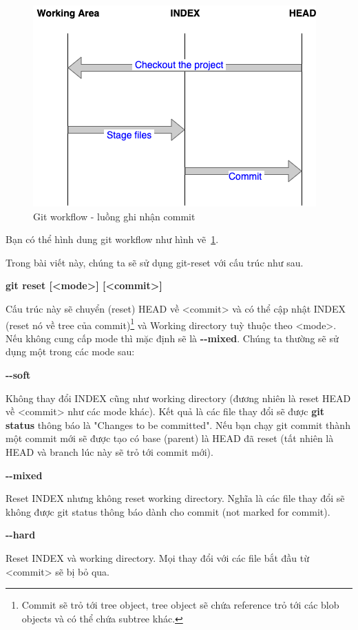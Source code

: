 \documentclass[a4paper, 11pt]{article}
\begin{document}
\begin{figure}
\centering
\includegraphics[scale=0.6]{git-workflow.png}
\caption{Git workflow - luồng ghi nhận commit}
\label{fig:git-workflow}
\end{figure}

Bạn có thể hình dung git workflow như hình vẽ~\ref{fig:git-workflow}.

Trong bài viết này, chúng ta sẽ sử dụng git-reset với cấu trúc như sau.

\textbf{git reset [<mode>] [<commit>]}

Cấu trúc này sẽ chuyển (reset) HEAD về <commit> và có thể cập nhật INDEX (reset nó về tree của commit)\footnote{Commit sẽ trỏ tới tree object, tree object sẽ chứa reference trỏ tới các blob objects và có thể chứa subtree khác.} và Working directory tuỳ thuộc theo <mode>. Nếu không cung cấp mode thì mặc định sẽ là \textbf{-{}-mixed}. Chúng ta thường sẽ sử dụng một trong các mode sau:

\textbf{-{}-soft}

Không thay đổi INDEX cũng như working directory (đương nhiên là reset HEAD về <commit> như các mode khác). Kết quả là các file thay đổi sẽ được \textbf{git status} thông báo là "Changes to be committed". Nếu bạn chạy git commit thành một commit mới sẽ được tạo có base (parent) là HEAD đã reset (tất nhiên là HEAD và branch lúc này sẽ trỏ tới commit mới).

\textbf{-{}-mixed}

Reset INDEX nhưng không reset working directory. Nghĩa là các file thay đổi sẽ không được git status thông báo dành cho commit (not marked for commit).

\textbf{-{}-hard}

Reset INDEX và working directory. Mọi thay đổi với các file bắt đầu từ <commit> sẽ bị bỏ qua.
\end{document}
